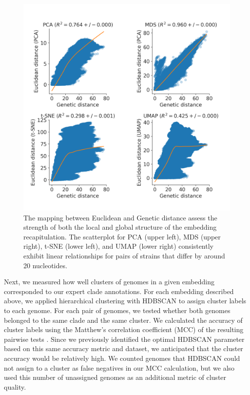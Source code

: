 \documentclass[9pt,lineno]{elife}
\begin{document}
\begin{figure}[htb]
  \begin{center}
  \includegraphics[width=\columnwidth]{FullScatterplotFlu.png}
  \caption{
    The mapping between Euclidean and Genetic distance assess the strength of both the local and global structure of the embedding recapitulation.
    The scatterplot for PCA (upper left), MDS (upper right), t-SNE (lower left), and UMAP (lower right) consistently exhibit linear relationships for pairs of strains that differ by around 20 nucleotides.
  }
  \label{fig:seasonal-influenza-h3n2-ha-pairwise-distances}
  \end{center}
\end{figure}

Next, we measured how well clusters of genomes in a given embedding corresponded to our expert clade annotations.
For each embedding described above, we applied hierarchical clustering with HDBSCAN to assign cluster labels to each genome.
For each pair of genomes, we tested whether both genomes belonged to the same clade and the same cluster.
We calculated the accuracy of cluster labels using the Matthew's correlation coefficient (MCC) of the resulting pairwise tests \citep{matthews_1975}.
Since we previously identified the optimal HDBSCAN parameter based on this same accuracy metric and dataset, we anticipated that the cluster accuracy would be relatively high.
We counted genomes that HDBSCAN could not assign to a cluster as false negatives in our MCC calculation, but we also used this number of unassigned genomes as an additional metric of cluster quality.
\end{document}
